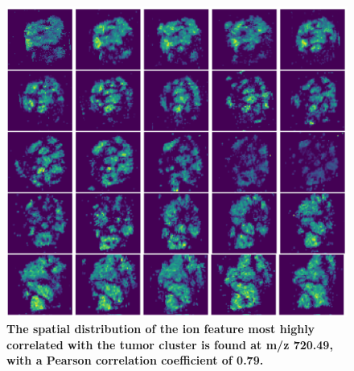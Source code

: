 \documentclass{WileyMSP-template}
\begin{document}
\begin{figure}[htbp]
  \includegraphics[width=\textwidth]{pic/mzs_all_clusters.png}
  \captionsetup{justification=raggedright,singlelinecheck=false}
  \caption{
    \textbf{The spatial distribution of the ion feature most highly correlated with the tumor cluster is found at m/z 720.49, 
    with a Pearson correlation coefficient of 0.79.}
    }
  \label{fig:tumor colorectal adenocarcinoma dataset}
\end{figure}
\end{document}
